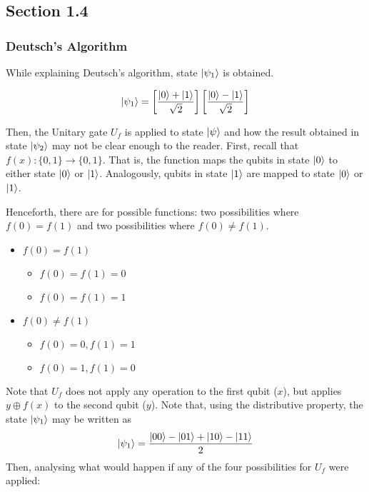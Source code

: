 \subsection{Section 1.4}
\subsubsection{Deutsch's Algorithm}

While explaining Deutsch's algorithm, state \( \ket{\psi_1} \) is obtained.

\[
\ket{\psi_1} = \left[ \frac{\ket{0} + \ket{1}}{\sqrt{2}} \right]
    \left[ \frac{\ket{0} - \ket{1}}{\sqrt{2}} \right]
\]

Then, the Unitary gate \(U_f\) is applied to state \(\ket{\psi}\) and how the result obtained in state \(\ket{\psi_2}\) may not be clear enough to the reader. First, recall that \(f(x) : \{0, 1\} \to \{0, 1\}\). That is, the function maps the qubits in state \(\ket{0}\) to either state \(\ket{0}\) or \(\ket{1}\). Analogously, qubits in state \(\ket{1}\) are mapped to state \(\ket{0}\) or \(\ket{1}\).

Henceforth, there are for possible functions: two possibilities where \(f(0) = f(1)\) and two possibilities where \(f(0) \neq f(1)\).

\begin{itemize}
    \item \(f(0) = f(1)\)
    \begin{itemize}
        \item \(f(0) = f(1) = 0\)
        \item \(f(0) = f(1) = 1\)
    \end{itemize}
    
    \item \(f(0) \neq f(1)\)
    \begin{itemize}
        \item \(f(0) = 0, f(1) = 1\)
        \item \(f(0) = 1, f(1) = 0\)
    \end{itemize}
\end{itemize}

Note that \(U_f\) does not apply any operation to the first qubit (\(x\)), but applies \(y \oplus f(x)\) to the second qubit (\(y\)). Note that, using the distributive property, the state \(\ket{\psi_1}\) may be written as
\[\ket{\psi_1} = \frac{\ket{00} - \ket{01} + \ket{10} - \ket{11}}{2}\]
Then, analysing what would happen if any of the four possibilities for \(U_f\) were applied:

